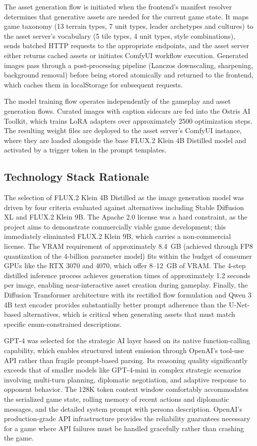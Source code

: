 \documentclass[conference]{IEEEtran}
\begin{document}
The asset generation flow is initiated when the frontend's manifest resolver determines that generative assets are needed for the current game state. It maps game taxonomy (13 terrain types, 7 unit types, leader archetypes and cultures) to the asset server's vocabulary (5 tile types, 4 unit types, style combinations), sends batched HTTP requests to the appropriate endpoints, and the asset server either returns cached assets or initiates ComfyUI workflow execution. Generated images pass through a post-processing pipeline (Lanczos downscaling, sharpening, background removal) before being stored atomically and returned to the frontend, which caches them in localStorage for subsequent requests.

The model training flow operates independently of the gameplay and asset generation flows. Curated images with caption sidecars are fed into the Ostris AI Toolkit, which trains LoRA adapters over approximately 2500 optimization steps. The resulting weight files are deployed to the asset server's ComfyUI instance, where they are loaded alongside the base FLUX.2 Klein 4B Distilled model and activated by a trigger token in the prompt templates.

\subsection{Technology Stack Rationale}

The selection of FLUX.2 Klein 4B Distilled as the image generation model was driven by four criteria evaluated against alternatives including Stable Diffusion XL and FLUX.2 Klein 9B. The Apache 2.0 license was a hard constraint, as the project aims to demonstrate commercially viable game development; this immediately eliminated FLUX.2 Klein 9B, which carries a non-commercial license. The VRAM requirement of approximately 8.4~GB (achieved through FP8 quantization of the 4-billion parameter model) fits within the budget of consumer GPUs like the RTX 3070 and 4070, which offer 8--12~GB of VRAM. The 4-step distilled inference process achieves generation times of approximately 1.2 seconds per image, enabling near-interactive asset creation during gameplay. Finally, the Diffusion Transformer architecture with its rectified flow formulation and Qwen 3 4B text encoder provides substantially better prompt adherence than the U-Net-based alternatives, which is critical when generating assets that must match specific enum-constrained descriptions.

GPT-4 was selected for the strategic AI layer based on its native function-calling capability, which enables structured intent emission through OpenAI's tool-use API rather than fragile prompt-based parsing. Its reasoning quality significantly exceeds that of smaller models like GPT-4-mini in complex strategic scenarios involving multi-turn planning, diplomatic negotiation, and adaptive response to opponent behavior. The 128K token context window comfortably accommodates the serialized game state, rolling memory of recent actions and diplomatic messages, and the detailed system prompt with persona description. OpenAI's production-grade API infrastructure provides the reliability guarantees necessary for a game where API failures must be handled gracefully rather than crashing the game.
\end{document}
